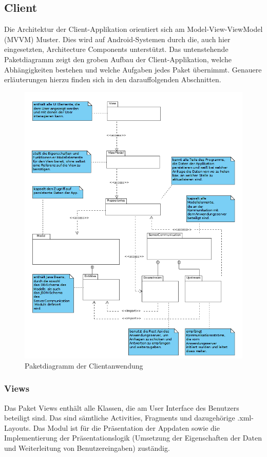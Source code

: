 \subsection{Client}
Die Architektur der Client-Applikation orientiert sich am Model-View-ViewModel (MVVM) Muster. Dies wird auf Android-Systemen durch die, auch hier eingesetzten, Architecture Components unterstützt. Das untenstehende Paketdiagramm zeigt den groben Aufbau der Client-Applikation, welche Abhängigkeiten bestehen und welche Aufgaben jedes Paket übernimmt. Genauere erläuterungen hierzu finden sich in den darauffolgenden Abschnitten.

\begin{figure}[H]
	\centering
	\includegraphics[scale=0.5]{../Klassendiagramme/paketdiagramm_client.png}
	\caption{Paketdiagramm der Clientanwendung}
\end{figure}

\subsubsection{Views}
Das Paket Views enthält alle Klassen, die am User Interface des Benutzers beteiligt sind. Das sind sämtliche Activities, Fragments und dazugehörige .xml-Layouts. Das Modul ist für die Präsentation der Appdaten sowie die Implementierung der Präsentationslogik (Umsetzung der Eigenschaften der Daten und Weiterleitung von Benutzereingaben) zuständig.

